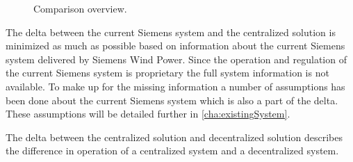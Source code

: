 \begin{figure}[!h]
	\centering
	
	\caption[Comparison overview]{
		\label{fig:projectDiffOverview} 
		\footnotesize{%
			Comparison overview.
		}
	}
\end{figure}

The delta between the current Siemens system and the centralized solution is minimized as much as possible based on information about the current Siemens system delivered by Siemens Wind Power. Since the operation and regulation of the current Siemens system is proprietary the full system information is not available. To make up for the missing information a number of assumptions has been done about the current Siemens system which is also a part of the delta. These assumptions will be detailed further in \cref{cha:existingSystem}. 

The delta between the centralized solution and decentralized solution describes the difference in operation of a centralized system and a decentralized system.




